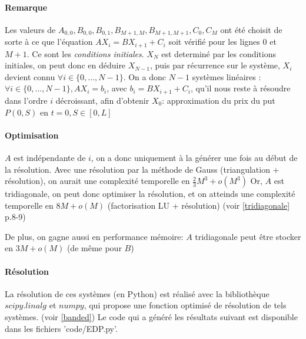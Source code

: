 \documentclass[10pt]{article}
\begin{document}
  \paragraph{Remarque} Les valeurs de $A_{0, 0}, B_{0, 0}, B_{0, 1}, B_{M+1, M}, B_{M+1, M+1}, C_0, C_M$ ont été choisit de sorte à ce que l'équation
  $A X_i = B X_{i+1} + C_i$ soit vérifié pour les lignes $0$ et $M+1$. Ce sont les \textit{conditions initiales}.
  \newline
  \newline
  $X_{N}$ est determiné par les conditions initiales, on peut donc en déduire $X_{N-1}$, puis par récurrence sur le système,
  $X_i$ devient connu $\forall i \in \{0, ..., N - 1\}$.
  \newline
  \newline
  On a donc $N - 1$ systèmes linéaires : $\forall i \in \{0, ..., N - 1\}, A X_i = b_i$, avec $b_i = B X_{i+1} + C_i$,
  qu'il nous reste à résoudre dans l'ordre $i$ décroissant, afin d'obtenir $X_0$: approximation du prix du put $P(0, S)$ en $t=0, S \in [0, L]$
  
  \paragraph{Optimisation} $A$ est indépendante de $i$, on a donc uniquement à la générer une fois au début de la résolution.
  Avec une résolution par la méthode de Gauss (triangulation + résolution), on aurait une complexité temporelle en $\frac{2}{3}M^3 + o(M^3)$
  Or, $A$ est tridiagonale, on peut donc optimiser la résolution, et on atteinds une complexité temporelle en $8M + o(M)$ (factorisation LU + résolution) (voir \ref{tridiagonale} p.8-9)
  
  De plus, on gagne aussi en performance mémoire: $A$ tridiagonale peut être stocker en $3M + o(M)$ (de même pour $B$)
  
  \paragraph{Résolution}
  La résolution de ces systèmes (en Python) est réalisé avec la bibliothèque $scipy.linalg$ et $numpy$,
  qui propose une fonction optimisé de résolution de tels systèmes. (voir \ref{banded})
  \newline
  \newline
  Le code qui a généré les résultats suivant est disponible dans les fichiers 'code/EDP.py'.
  
\end{document}
